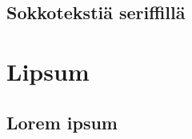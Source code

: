 \textsf{\blindtext}

\section{Sokkotekstiä seriffillä}

\textrm{\blindtext}




\chapter{Lipsum}


\section{Lorem ipsum}

\lipsum[1-5]

\texttt{\lipsum[6-10]}

\textsf{\lipsum[11-15]}

\textrm{\lipsum[16-20]}

